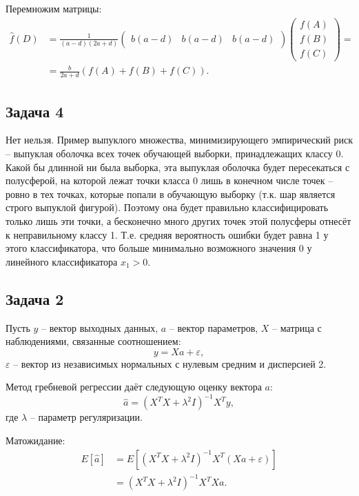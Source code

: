 \documentclass[a4paper, 12pt, onepage]{article}
\begin{document}
Перемножим матрицы:
\begin{align*}
  \hat{f}(D) &=
  \frac{1}{(a-d)(2a+d)}
  \begin{pmatrix}
    b(a-d) & b(a-d) & b(a-d)
  \end{pmatrix}
  \begin{pmatrix}
    f(A) \\ f(B) \\ f(C)
  \end{pmatrix} = \\
  &= 
  \frac{b}{2a+d}\left(f(A)+f(B)+f(C)\right).
\end{align*}


\subsection*{Задача 4}

Нет нельзя. Пример выпуклого множества, минимизирующего эмпирический риск --
выпуклая оболочка всех точек обучающей выборки, принадлежащих классу 0.
Какой бы длинной ни была выборка, эта выпуклая оболочка будет пересекаться
с полусферой, на которой лежат точки класса 0 лишь в конечном числе
точек -- ровно в тех точках, которые попали в обучающую выборку
(т.к. шар является строго выпуклой фигурой). Поэтому она будет
правильно классифицировать только лишь эти точки, а бесконечно много
других точек этой полусферы отнесёт к неправильному классу 1.
Т.е. средняя вероятность ошибки будет равна 1 у этого классификатора,
что больше минимально возможного значения 0 у линейного классификатора $x_1 > 0$.

\subsection*{Задача 2}

Пусть $y$ -- вектор выходных данных, $a$ -- вектор параметров, $X$ -- матрица
с наблюдениями, связанные соотношением:
$$ y = Xa + \varepsilon,$$
$\varepsilon$ -- вектор из независимых нормальных с нулевым средним и дисперсией 2.

Метод гребневой регрессии даёт следующую оценку вектора $a$:
$$ \hat{a} = (X^T X + \lambda^2 I)^{-1} X^T y, $$
где $\lambda$ -- параметр регуляризации.

Матожидание:
\begin{align*}
E[\hat{a}] &= E[(X^T X + \lambda^2 I)^{-1} X^T (Xa + \varepsilon)] \\
   &= (X^T X + \lambda^2 I)^{-1} X^T X a.
\end{align*}
\end{document}
